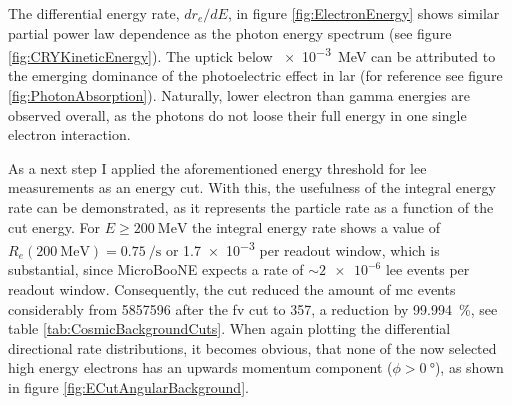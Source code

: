 The differential energy rate, $dr_e/dE$, in figure \ref{fig:ElectronEnergy} shows similar partial power law dependence as the photon energy spectrum (see figure \ref{fig:CRYKineticEnergy}). The uptick below \SI{e-3}{\mega\electronvolt} can be attributed to the emerging dominance of the photoelectric effect in \gls{lar} (for reference see figure \ref{fig:PhotonAbsorption}). Naturally, lower electron than gamma energies are observed overall, as the photons do not loose their full energy in one single electron interaction.

As a next step I applied the aforementioned energy threshold for \gls{lee} measurements as an energy cut. With this, the usefulness of the integral energy rate can be demonstrated, as it represents the particle rate as a function of the cut energy. For $E \geq \SI{200}{\mega\electronvolt}$ the integral energy rate shows a value of $R_e(\SI{200}{\mega\electronvolt}) = \SI{0.75}{\per\second}$ or \num{1.7e-3} per readout window, which is substantial, since MicroBooNE expects a rate of $\sim\num{2e-6}$ \gls{lee} events per readout window. Consequently, the cut reduced the amount of \gls{mc} events considerably from \num{5857596} after the \gls{fv} cut to \num{357}, a reduction by \SI{99.994}{\percent}, see table \ref{tab:CosmicBackgroundCuts}. When again plotting the differential directional rate distributions, it becomes obvious, that none of the now selected high energy electrons has an upwards momentum component ($\phi > \SI{0}{\degree}$), as shown in figure \ref{fig:ECutAngularBackground}.
